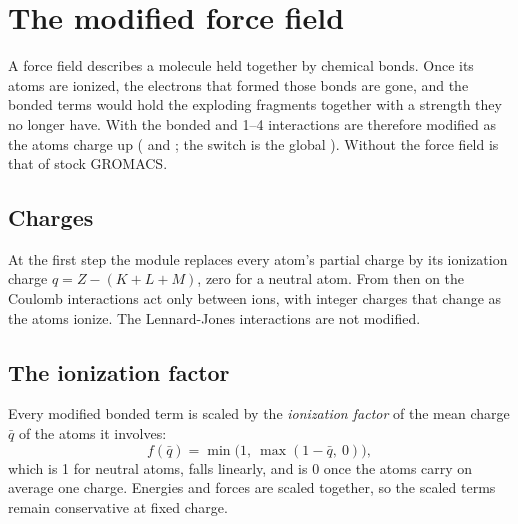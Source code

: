 \chapter{The modified force field}
\label{ch:ff}

A force field describes a molecule held together by chemical bonds.
Once its atoms are ionized, the electrons that formed those bonds are gone, and the bonded terms would hold the
exploding fragments together with a strength they no longer have.
With  the bonded and 1--4 interactions are therefore modified as the atoms charge up
( and ; the switch is the global
).
Without  the force field is that of stock GROMACS.

\section{Charges}

At the first step the module replaces every atom's partial charge by its ionization charge $q = Z-(K+L+M)$, zero for
a neutral atom.
From then on the Coulomb interactions act only between ions, with integer charges that change as the atoms ionize.
The Lennard-Jones interactions are not modified.

\section{The ionization factor}

Every modified bonded term is scaled by the \emph{ionization factor} of the mean charge $\bar q$ of the atoms it
involves:
\begin{equation}
  f(\bar q) = \min\!\big(1,\ \max(1-\bar q,\ 0)\big),
\end{equation}
which is 1 for neutral atoms, falls linearly, and is 0 once the atoms carry on average one charge.
Energies and forces are scaled together, so the scaled terms remain conservative at fixed charge.

